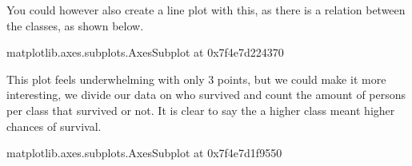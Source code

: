 \documentclass[letterpaper,10pt,english]{jupyterBook}
\begin{document}
\sphinxAtStartPar
You could however also create a line plot with this, as there is a relation between the classes, as shown below.

\begin{sphinxVerbatim}[commandchars=\\\{\}]
\PYG{p}{[}\PYG{p}{]}\PYG{p}{[}\PYG{p}{[}  \PYG{p}{]}\PYG{p}{]}
\end{sphinxVerbatim}

\begin{sphinxVerbatim}[commandchars=\\\{\}]
\PYGZlt{}matplotlib.axes.\PYGZus{}subplots.AxesSubplot at 0x7f4e7d224370\PYGZgt{}
\end{sphinxVerbatim}

\noindent{}

\sphinxAtStartPar
This plot feels underwhelming with only 3 points, but we could make it more interesting, we divide our data on who survived and count the amount of persons per class that survived or not. It is clear to say the a higher class meant higher chances of survival.

\begin{sphinxVerbatim}[commandchars=\\\{\}]
\PYG{p}{[}\PYG{p}{]}  \PYG{p}{[}  \PYG{p}{]}
\end{sphinxVerbatim}

\begin{sphinxVerbatim}[commandchars=\\\{\}]
\PYGZlt{}matplotlib.axes.\PYGZus{}subplots.AxesSubplot at 0x7f4e7d1f9550\PYGZgt{}
\end{sphinxVerbatim}
\end{document}
